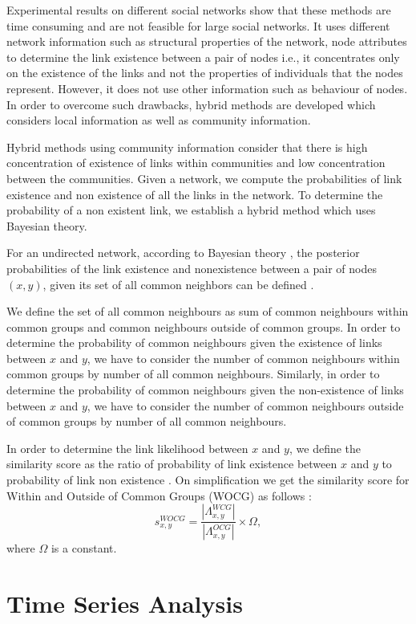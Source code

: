 Experimental results on different social networks show that these methods are time consuming and are not feasible for large social networks. It uses different network information such as structural properties of the network, node attributes to determine the link existence between a pair of nodes i.e., it concentrates only on the existence of the links and not the properties of individuals that the nodes represent. However, it does not use other information such as behaviour of nodes. In order to overcome such drawbacks, hybrid methods are developed which considers local information as well as community information.

Hybrid methods using community information consider that there is high concentration of existence of links within communities and low concentration between the communities. Given a network, we compute the probabilities of link existence and non existence of all the links in the network. To determine the probability of a non existent link, we establish a hybrid method which uses Bayesian theory.

For an undirected network, according to Bayesian theory \cite{hastie2005elements}, the posterior probabilities of the link existence and nonexistence between a pair of nodes $(x,y)$, given its set of all common neighbors can be defined \cite{valverde2014link}. 

We define the set of all common neighbours as sum of common neighbours within common groups and common neighbours outside of common groups. In order to determine the probability of common neighbours given the existence of links between $x$ and $y$, we have to consider the number of common neighbours within common groups by number of all common neighbours. Similarly, in order to determine the probability of common neighbours given the non-existence of links between $x$ and $y$, we have to consider the number of common neighbours outside of common groups by number of all common neighbours.

In order to determine the link likelihood between $x$ and $y$, we define the similarity
score as the ratio of probability of link existence between $x$ and $y$ to probability of link non existence \cite{valverde2014link}. 
On simplification we get the similarity score for Within and Outside of Common Groups (WOCG) \cite{valverde2014link} as follows :
$$s_{x,y}^{WOCG} = \frac{|\Lambda_{x,y}^{WCG}|}{|\Lambda_{x,y}^{OCG}|}\times \Omega,$$
where $\Omega$ is a constant.


\section{Time Series Analysis}\label{SecTSA}

